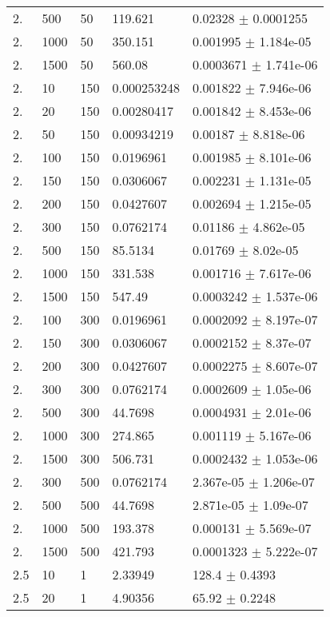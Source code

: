 \begin{longtable}{lllll}
  2. &   500 &    50 &  119.621 &  0.02328 $\pm$ 0.0001255 \\
  2. &  1000 &    50 &  350.151 & 0.001995 $\pm$ 1.184e-05 \\
  2. &  1500 &    50 &   560.08 & 0.0003671 $\pm$ 1.741e-06 \\
  2. &    10 &   150 & 0.000253248 & 0.001822 $\pm$ 7.946e-06 \\
  2. &    20 &   150 & 0.00280417 & 0.001842 $\pm$ 8.453e-06 \\
  2. &    50 &   150 & 0.00934219 &  0.00187 $\pm$ 8.818e-06 \\
  2. &   100 &   150 & 0.0196961 & 0.001985 $\pm$ 8.101e-06 \\
  2. &   150 &   150 & 0.0306067 & 0.002231 $\pm$ 1.131e-05 \\
  2. &   200 &   150 & 0.0427607 & 0.002694 $\pm$ 1.215e-05 \\
  2. &   300 &   150 & 0.0762174 &  0.01186 $\pm$ 4.862e-05 \\
  2. &   500 &   150 &  85.5134 &  0.01769 $\pm$ 8.02e-05 \\
  2. &  1000 &   150 &  331.538 & 0.001716 $\pm$ 7.617e-06 \\
  2. &  1500 &   150 &   547.49 & 0.0003242 $\pm$ 1.537e-06 \\
  2. &   100 &   300 & 0.0196961 & 0.0002092 $\pm$ 8.197e-07 \\
  2. &   150 &   300 & 0.0306067 & 0.0002152 $\pm$ 8.37e-07 \\
  2. &   200 &   300 & 0.0427607 & 0.0002275 $\pm$ 8.607e-07 \\
  2. &   300 &   300 & 0.0762174 & 0.0002609 $\pm$ 1.05e-06 \\
  2. &   500 &   300 &  44.7698 & 0.0004931 $\pm$ 2.01e-06 \\
  2. &  1000 &   300 &  274.865 & 0.001119 $\pm$ 5.167e-06 \\
  2. &  1500 &   300 &  506.731 & 0.0002432 $\pm$ 1.053e-06 \\
  2. &   300 &   500 & 0.0762174 & 2.367e-05 $\pm$ 1.206e-07 \\
  2. &   500 &   500 &  44.7698 & 2.871e-05 $\pm$ 1.09e-07 \\
  2. &  1000 &   500 &  193.378 & 0.000131 $\pm$ 5.569e-07 \\
  2. &  1500 &   500 &  421.793 & 0.0001323 $\pm$ 5.222e-07 \\
 2.5 &    10 &     1 &  2.33949 &    128.4 $\pm$   0.4393 \\
 2.5 &    20 &     1 &  4.90356 &    65.92 $\pm$   0.2248 \\

\end{longtable}
